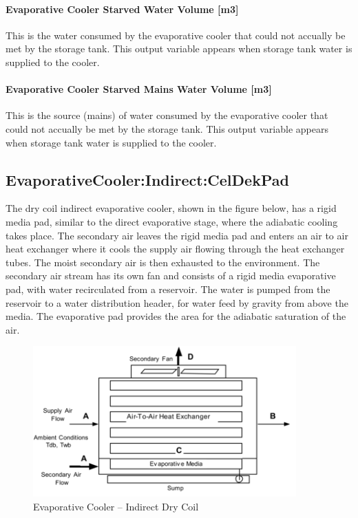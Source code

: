 \paragraph{Evaporative Cooler Starved Water Volume {[}m3{]}}\label{evaporative-cooler-starved-water-volume-m3-1}

This is the water consumed by the evaporative cooler that could not accually be met by the storage tank. This output variable appears when storage tank water is supplied to the cooler.

\paragraph{Evaporative Cooler Starved Mains Water Volume {[}m3{]}}\label{evaporative-cooler-starved-mains-water-volume-m3-1}

This is the source (mains) of water consumed by the evaporative cooler that could not accually be met by the storage tank. This output variable appears when storage tank water is supplied to the cooler.

\subsection{EvaporativeCooler:Indirect:CelDekPad}\label{evaporativecoolerindirectceldekpad}

The dry coil indirect evaporative cooler, shown in the figure below, has a rigid media pad, similar to the direct evaporative stage, where the adiabatic cooling takes place. The secondary air leaves the rigid media pad and enters an air to air heat exchanger where it cools the supply air flowing through the heat exchanger tubes. The moist secondary air is then exhausted to the environment. The secondary air stream has its own fan and consists of a rigid media evaporative pad, with water recirculated from a reservoir. The water is pumped from the reservoir to a water distribution header, for water feed by gravity from above the media. The evaporative pad provides the area for the adiabatic saturation of the air.

\begin{figure}[hbtp] %
\centering
\includegraphics[width=0.9\textwidth, height=0.9\textheight, keepaspectratio=true]{media/image419.png}
\caption{Evaporative Cooler -- Indirect Dry Coil \protect \label{fig:evaporative-cooler-indirect-dry-coil}}
\end{figure}

